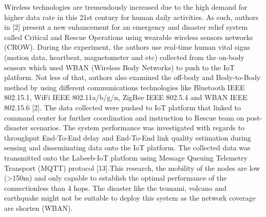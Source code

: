 \documentclass{article}
\begin{document}
Wireless technologies are tremendously increased due to the high demand for higher data rate in this 21st century for human daily activities. As such, authors in [2] present a new enhancement for an emergency and disaster relief system called Critical and Rescue Operations using wearable wireless sensors networks (CROW). During the experiment, the authors use real-time human vital signs (motion data, heartbeat, magnetometer and etc) collected from the on-body sensors which used WBAN (Wireless Body Networks) to push to the IoT platform. Not less of that, authors also examined the off-body and Body-to-Body method by using different communications technologies like Bluetooth IEEE 802.15.1, WiFi IEEE 802.11a/b/g/n, ZigBee IEEE 802.5.4 and WBAN IEEE 802.15.6 [2]. The data collected were pushed to IoT platform that linked to command center for further coordination and instruction to Rescue team on post-disaster scenarios. The system performance was investigated with regards to throughput End-To-End delay and End-To-End link quality estimation during sensing and disseminating data onto the IoT platform. The collected data was transmitted onto the Labeeb-IoT platform using Message Queuing Telemetry Transport (MQTT) protocol [13].This research, the mobility of the nodes are low (>150m) and only capable to establish the optimal performance of the connectionless than 4 hops. The disaster like the tsunami, volcano and earthquake might not be suitable to deploy this system as the network coverage are shorten (WBAN).
\end{document}
